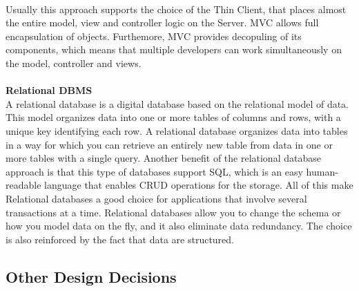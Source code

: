 \documentclass[a4paper, 12pt, oneside, table]{article}
\begin{document}
\\
Usually this approach 
supports the choice of the Thin Client, that places almost the entire model, view and controller logic on the Server. MVC allows full encapsulation of objects. Furthemore, MVC provides decopuling of its components, which means that multiple developers can work simultaneously on the model, controller and views.\\
\\
\textbf{Relational DBMS}\\
A relational database is a digital database based on the relational model of data. This model organizes data into one or more tables of columns and rows, with a unique key identifying each row. A relational database organizes data into tables in a way for which you can retrieve an entirely new table from data in one or more tables with a single query. Another benefit of the relational database approach is that this type of databases support SQL, which is an easy human-readable language that enables CRUD operations for the storage. All of this make Relational databases a good choice for applications that involve several transactions at a time. Relational databases allow you to change the schema or how you model data on the fly, and it also eliminate data redundancy. The choice is also reinforced by the fact that data are structured.

\subsection{Other Design Decisions}
\end{document}
